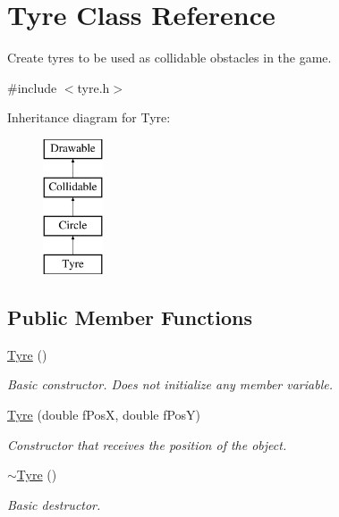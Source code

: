 \hypertarget{class_tyre}{}\section{Tyre Class Reference}
\label{class_tyre}


Create tyres to be used as collidable obstacles in the game.  




{\ttfamily \#include $<$tyre.\+h$>$}

Inheritance diagram for Tyre\+:\begin{figure}[H]
\begin{center}
\leavevmode
\includegraphics[height=4.000000cm]{class_tyre}
\end{center}
\end{figure}
\subsection*{Public Member Functions}
\begin{DoxyCompactItemize}
\item 
\hypertarget{class_tyre_a162dbaad7ae74443df530dfb147fb694}{}\hyperlink{class_tyre_a162dbaad7ae74443df530dfb147fb694}{Tyre} ()\label{class_tyre_a162dbaad7ae74443df530dfb147fb694}

\begin{DoxyCompactList}\small\item\em Basic constructor. Does not initialize any member variable. \end{DoxyCompactList}\item 
\hyperlink{class_tyre_aa8316602e846dd79412579a2c3ad92c7}{Tyre} (double f\+Pos\+X, double f\+Pos\+Y)
\begin{DoxyCompactList}\small\item\em Constructor that receives the position of the object. \end{DoxyCompactList}\item 
\hypertarget{class_tyre_a3ace196877f68acd82b89e8cd33825ec}{}\hyperlink{class_tyre_a3ace196877f68acd82b89e8cd33825ec}{$\sim$\+Tyre} ()\label{class_tyre_a3ace196877f68acd82b89e8cd33825ec}

\begin{DoxyCompactList}\small\item\em Basic destructor. \end{DoxyCompactList}\end{DoxyCompactItemize}
